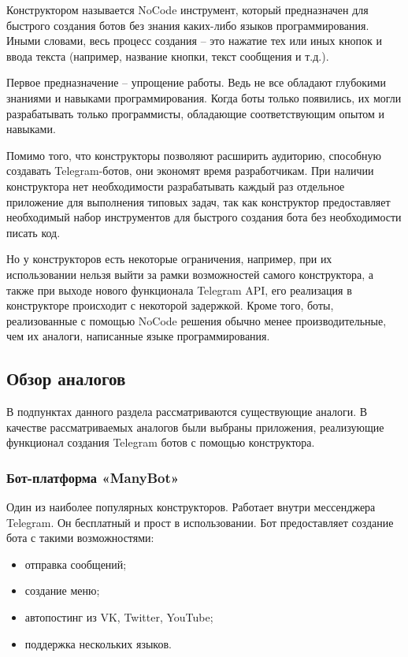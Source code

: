Конструктором называется NoCode инструмент, который
предназначен для
быстрого создания ботов без знания каких-либо языков программирования.
Иными словами, весь процесс создания – это нажатие тех или иных кнопок и
ввода текста (например, название кнопки, текст сообщения и т.д.).

Первое предназначение – упрощение работы. Ведь не все обладают
глубокими знаниями и навыками программирования. Когда боты только
появились, их могли разрабатывать только программисты, обладающие
соответствующим опытом и навыками.

Помимо того, что конструкторы позволяют расширить аудиторию,
способную создавать Telegram-ботов, они экономят время разработчикам. При
наличии конструктора нет необходимости разрабатывать каждый раз
отдельное приложение для выполнения типовых
задач, так как конструктор предоставляет необходимый
набор инструментов для быстрого создания бота
без необходимости писать код.

Но у конструкторов есть некоторые ограничения, например, при их
использовании нельзя выйти за рамки возможностей самого конструктора, а
также при выходе нового функционала Telegram API, его реализация в
конструкторе происходит с некоторой задержкой. Кроме того, боты,
реализованные с помощью NoCode решения обычно менее производительные,
чем их аналоги, написанные языке программирования.



\subsection{Обзор аналогов}

В подпунктах данного раздела рассматриваются существующие аналоги.
В качестве рассматриваемых аналогов были выбраны приложения,
реализующие функционал создания Telegram ботов с помощью конструктора.


\subsubsection{Бот-платформа «ManyBot»}


Один из наиболее популярных конструкторов. Работает внутри мессенджера Telegram.
Он бесплатный и прост в использовании.
Бот предоставляет создание бота с такими возможностями:
\begin{itemize}
	\item отправка сообщений;
	\item создание меню;
	\item автопостинг из VK, Twitter, YouTube;
	\item поддержка нескольких языков.
\end{itemize}

